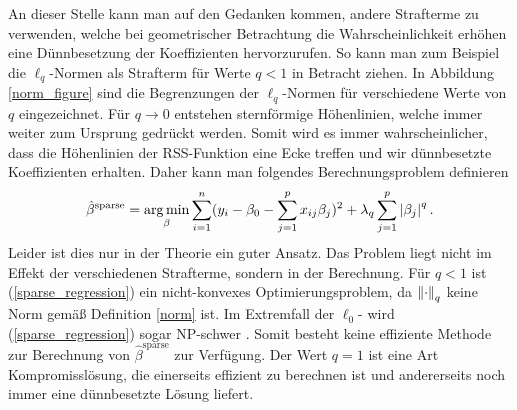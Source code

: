 An dieser Stelle kann man auf den Gedanken kommen, andere Strafterme zu verwenden, welche bei geometrischer Betrachtung die Wahrscheinlichkeit erhöhen eine Dünnbesetzung der Koeffizienten hervorzurufen. So kann man zum Beispiel die $\ell_q$-Normen als Strafterm für Werte $q < 1$ in Betracht ziehen. In Abbildung \ref{norm_figure} sind die Begrenzungen der $\ell_q$-Normen für verschiedene Werte von $q$ eingezeichnet. Für $q \rightarrow 0$ entstehen sternförmige Höhenlinien, welche immer weiter zum Ursprung gedrückt werden. Somit wird es immer wahrscheinlicher, dass die Höhenlinien der RSS-Funktion eine Ecke treffen und wir dünnbesetzte Koeffizienten erhalten. Daher kann man folgendes Berechnungsproblem definieren
\begin{align}
\label{sparse_regression}
\hat{\beta}^{\text{sparse}} = \operatorname*{arg\,min}_{\beta} \sum_{i=1}^{n}(y_i - \beta_0 - \sum_{j=1}^p x_{ij}\beta_j)^2 + \lambda_q\sum_{j=1}^p \left|\beta_j\right|^q.
\end{align}
Leider ist dies nur in der Theorie ein guter Ansatz. Das Problem liegt nicht im Effekt der verschiedenen Strafterme, sondern in der Berechnung. Für $q < 1$ ist (\ref{sparse_regression}) ein nicht-konvexes Optimierungsproblem, da $\left\lVert \cdot \right\rVert_q$ keine Norm gemäß Definition \ref{norm} ist. Im Extremfall der $\ell_0$- wird (\ref{sparse_regression}) sogar NP-schwer \cite{foucart}. Somit besteht keine effiziente Methode zur Berechnung von $\hat{\beta}^{\text{sparse}}$ zur Verfügung. Der Wert $q = 1$ ist eine Art Kompromisslösung, die einerseits effizient zu berechnen ist und andererseits noch immer eine dünnbesetzte Lösung liefert.

